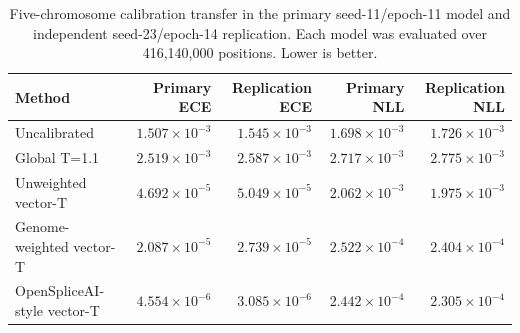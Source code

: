 \begin{table}
\caption{Five-chromosome calibration transfer in the primary seed-11/epoch-11 model and independent seed-23/epoch-14 replication. Each model was evaluated over 416,140,000 positions. Lower is better.}
\label{tab:flank400_chromosome_transfer_cross_seed}
\begin{tabular}{lrrrr}
\toprule
Method & Primary ECE & Replication ECE & Primary NLL & Replication NLL \\
\midrule
Uncalibrated & $1.507\times 10^{-3}$ & $1.545\times 10^{-3}$ & $1.698\times 10^{-3}$ & $1.726\times 10^{-3}$ \\
Global T=1.1 & $2.519\times 10^{-3}$ & $2.587\times 10^{-3}$ & $2.717\times 10^{-3}$ & $2.775\times 10^{-3}$ \\
Unweighted vector-T & $4.692\times 10^{-5}$ & $5.049\times 10^{-5}$ & $2.062\times 10^{-3}$ & $1.975\times 10^{-3}$ \\
Genome-weighted vector-T & $2.087\times 10^{-5}$ & $2.739\times 10^{-5}$ & $2.522\times 10^{-4}$ & $2.404\times 10^{-4}$ \\
OpenSpliceAI-style vector-T & \textbf{$4.554\times 10^{-6}$} & \textbf{$3.085\times 10^{-6}$} & \textbf{$2.442\times 10^{-4}$} & \textbf{$2.305\times 10^{-4}$} \\
\bottomrule
\end{tabular}
\end{table}
